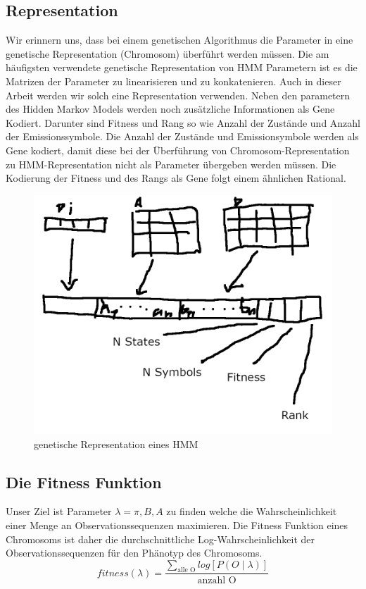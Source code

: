 \subsection*{Representation}
Wir erinnern uns, dass bei einem genetischen Algorithmus die Parameter in eine genetische Representation (Chromosom) überführt werden müssen. Die am häufigsten verwendete genetische Representation von HMM Parametern ist es die Matrizen der Parameter zu linearisieren und zu konkatenieren. Auch in dieser Arbeit werden wir solch eine Representation verwenden. Neben den parametern des Hidden Markov Models werden noch zusätzliche Informationen als Gene Kodiert. Darunter sind Fitness und Rang so wie Anzahl der Zustände und Anzahl der Emissionssymbole. Die Anzahl der Zustände und Emissionsymbole werden als Gene kodiert, damit diese bei der Überführung von Chromosom-Representation zu HMM-Representation nicht als Parameter übergeben werden müssen. Die Kodierung der Fitness und des Rangs als Gene folgt einem ähnlichen Rational.
\begin{figure}[h!]
    \includegraphics[scale=1.0]{images/Hmm_Chromosom_Representation.png}
    \caption{genetische Representation eines HMM}
    \label{fig:hmm_genetic_representation}
\end{figure}

\subsection*{Die Fitness Funktion}
Unser Ziel ist Parameter $\lambda = \pi, B, A$ zu finden welche die Wahrscheinlichkeit einer Menge an Observationssequenzen maximieren. Die Fitness Funktion eines Chromosoms ist daher die durchschnittliche Log-Wahrscheinlichkeit der Observationssequenzen für den Phänotyp des Chromosoms.
\begin{equation*}
    fitness(\lambda) = \frac{\sum_{\text{alle O}} log[P(O \mid \lambda)] }{\text{anzahl O}} 
\end{equation*}



